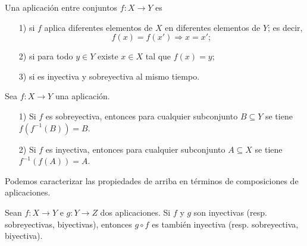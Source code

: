 \begin{definicion}
  \label{dfn:inyectivas-sobreyectivas-biyectivas}
  Una aplicación entre conjuntos $f\colon X\to Y$ es
  \begin{enumerate}
  \item[1)]  si $f$ aplica
    diferentes elementos de $X$ en diferentes elementos de $Y$; es decir,
    $$f (x) = f (x') \Longrightarrow x=x';$$

  \item[2)]  si para todo
    $y\in Y$ existe $x\in X$ tal que $f (x) = y$;

  \item[3)]  si es inyectiva y
    sobreyectiva al mismo tiempo.
  \end{enumerate}
\end{definicion}

\begin{observacionejerc}
  Sea $f\colon X\to Y$ una aplicación.

  \begin{enumerate}
  \item[1)] Si $f$ es sobreyectiva, entonces para cualquier subconjunto
    $B \subseteq Y$ se tiene ${f (f^{-1} (B)) = B}$.

  \item[2)] Si $f$ es inyectiva, entonces para cualquier subconjunto
    $A \subseteq X$ se tiene ${f^{-1} (f (A)) = A}$. \qedhere
  \end{enumerate}
\end{observacionejerc}

Podemos caracterizar las propiedades de arriba en términos de composiciones de
aplicaciones.

\begin{observacionejerc}
  \label{obs:composicion-de-inyectivas-sobreyectivas-biyectivas}
  Sean $f\colon X\to Y$ e $g\colon Y\to Z$ dos aplicaciones. Si $f$ y $g$ son
  inyectivas (resp. sobreyectivas, biyectivas), entonces $g\circ f$ es también
  inyectiva (resp. sobreyectiva, biyectiva).
\end{observacionejerc}

